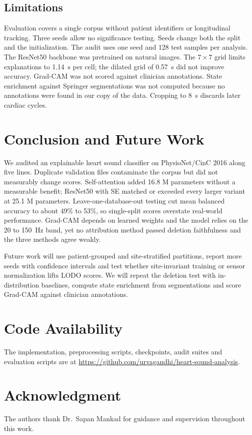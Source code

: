 \documentclass[conference]{IEEEtran}
\begin{document}
\subsection{Limitations}
Evaluation covers a single corpus without patient identifiers or longitudinal tracking. Three seeds allow no significance testing. Seeds change both the split and the initialization. The audit uses one seed and 128 test samples per analysis. The ResNet50 backbone was pretrained on natural images. The $7\times7$ grid limits explanations to 1.14~s per cell; the dilated grid of 0.57~s did not improve accuracy. Grad-CAM was not scored against clinician annotations. State enrichment against Springer segmentations was not computed because no annotations were found in our copy of the data. Cropping to 8~s discards later cardiac cycles.

\section{Conclusion and Future Work}
We audited an explainable heart sound classifier on PhysioNet/CinC 2016 along five lines. Duplicate validation files contaminate the corpus but did not measurably change scores. Self-attention added 16.8 M parameters without a measurable benefit; ResNet50 with SE matched or exceeded every larger variant at 25.1 M parameters. Leave-one-database-out testing cut mean balanced accuracy to about 49\% to 53\%, so single-split scores overstate real-world performance. Grad-CAM depends on learned weights and the model relies on the 20 to 150~Hz band, yet no attribution method passed deletion faithfulness and the three methods agree weakly.

Future work will use patient-grouped and site-stratified partitions, report more seeds with confidence intervals and test whether site-invariant training or sensor normalization lifts LODO scores. We will repeat the deletion test with in-distribution baselines, compute state enrichment from segmentations and score Grad-CAM against clinician annotations.

\section*{Code Availability}
The implementation, preprocessing scripts, checkpoints, audit suites and evaluation scripts are at \url{https://github.com/urvagandhi/heart-sound-analysis}.

\section*{Acknowledgment}
The authors thank Dr.\ Sapan Mankad for guidance and supervision throughout this work.
\end{document}

